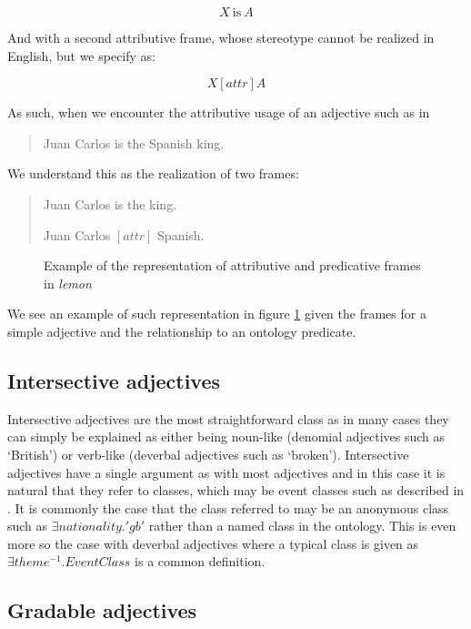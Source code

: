 \documentclass[11pt]{article}
\begin{document}
$$X\mathrm{~is~}A$$

And with a second attributive frame, whose stereotype cannot be realized in English, but we specify as:

$$X [attr] A$$

As such, when we encounter the attributive usage of an adjective such as in

\begin{quote}
Juan Carlos is the Spanish king.
\end{quote}

We understand this as the realization of two frames:

\begin{quote}
Juan Carlos is the king.

Juan Carlos $[attr]$ Spanish.
\end{quote}

\begin{figure}
\caption{\label{attr-pred-example}Example of the representation of attributive and predicative frames in \emph{lemon}}
\end{figure}

We see an example of such representation in figure \ref{attr-pred-example} given the frames for a simple adjective and the relationship to an ontology predicate.

\subsection{Intersective adjectives}

Intersective adjectives are the most straightforward class as in many cases they can simply be explained as either being noun-like (denomial adjectives such as `British') or verb-like (deverbal adjectives such as `broken'). Intersective adjectives have a single argument as with most adjectives and in this case it is natural that they refer to classes, which may be event classes such as described in \cite{mccrae2014design}. It is commonly the case that the class referred to may be an anonymous class such as $\exists nationality.'gb'$ rather than a named class in the ontology. This is even more so the case with deverbal adjectives where a typical class is given as $\exists theme^{-1}.EventClass$ is a common definition.

\subsection{Gradable adjectives}
\end{document}
